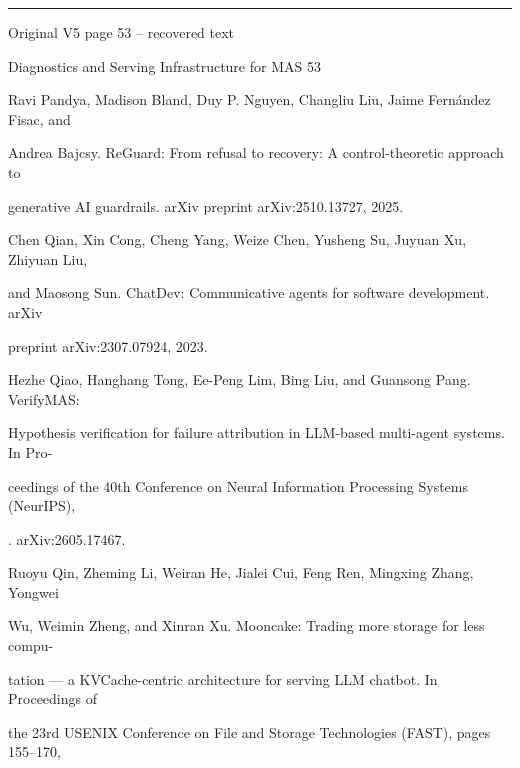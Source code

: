 \par\smallskip\noindent\rule{\textwidth}{0.4pt}\par{\sffamily\footnotesize Original V5 page 53 -- recovered text}\par\begin{flushleft}\footnotesize\ttfamily
\par\smallskip
\par\smallskip
\noindent Diagnostics and Serving Infrastructure for MAS 53\par
\par\smallskip
\par\smallskip
\par\smallskip
\noindent [29] Ravi Pandya, Madison Bland, Duy P. Nguyen, Changliu Liu, Jaime Fernández Fisac, and\par
\noindent  Andrea Bajcsy. ReGuard: From refusal to recovery: A control-theoretic approach to\par
\noindent  generative AI guardrails. arXiv preprint arXiv:2510.13727, 2025.\par
\par\smallskip
\noindent [30] Chen Qian, Xin Cong, Cheng Yang, Weize Chen, Yusheng Su, Juyuan Xu, Zhiyuan Liu,\par
\noindent  and Maosong Sun. ChatDev: Communicative agents for software development. arXiv\par
\noindent  preprint arXiv:2307.07924, 2023.\par
\par\smallskip
\noindent [31] Hezhe Qiao, Hanghang Tong, Ee-Peng Lim, Bing Liu, and Guansong Pang. VerifyMAS:\par
\noindent  Hypothesis verification for failure attribution in LLM-based multi-agent systems. In Pro-\par
\noindent  ceedings of the 40th Conference on Neural Information Processing Systems (NeurIPS),\par
{}. arXiv:2605.17467.\par
\par\smallskip
\noindent [32] Ruoyu Qin, Zheming Li, Weiran He, Jialei Cui, Feng Ren, Mingxing Zhang, Yongwei\par
\noindent  Wu, Weimin Zheng, and Xinran Xu. Mooncake: Trading more storage for less compu-\par
\noindent  tation — a KVCache-centric architecture for serving LLM chatbot. In Proceedings of\par
\noindent  the 23rd USENIX Conference on File and Storage Technologies (FAST), pages 155–170,\par

\end{flushleft}
